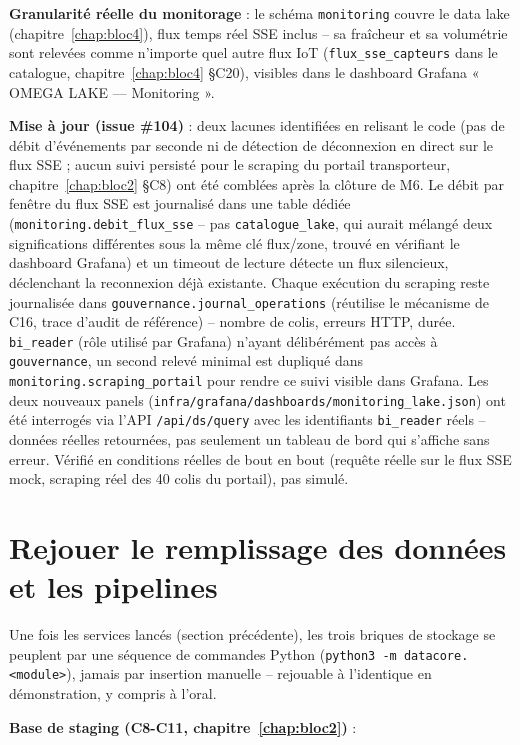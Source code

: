 \textbf{Granularité réelle du monitorage} : le schéma
\texttt{monitoring} couvre le data lake (chapitre~\ref{chap:bloc4}),
flux temps réel SSE inclus -- sa fraîcheur et sa volumétrie sont
relevées comme n'importe quel autre flux IoT (\texttt{flux\_sse\_capteurs}
dans le catalogue, chapitre~\ref{chap:bloc4} §C20), visibles dans le
dashboard Grafana « OMEGA LAKE --- Monitoring ».

\textbf{Mise à jour (issue \#104)} : deux lacunes identifiées en
relisant le code (pas de débit d'événements par seconde ni de
détection de déconnexion en direct sur le flux SSE ; aucun suivi
persisté pour le scraping du portail transporteur, chapitre~\ref{chap:bloc2}
§C8) ont été comblées après la clôture de M6. Le débit par fenêtre du
flux SSE est journalisé dans une table dédiée
(\texttt{monitoring.debit\_flux\_sse} -- pas \texttt{catalogue\_lake},
qui aurait mélangé deux significations différentes sous la même clé
flux/zone, trouvé en vérifiant le dashboard Grafana) et un timeout de
lecture détecte un flux silencieux, déclenchant la reconnexion déjà
existante. Chaque exécution du scraping reste journalisée dans
\texttt{gouvernance.journal\_operations} (réutilise le mécanisme de
C16, trace d'audit de référence) -- nombre de colis, erreurs HTTP,
durée. \texttt{bi\_reader} (rôle utilisé par Grafana) n'ayant
délibérément pas accès à \texttt{gouvernance}, un second relevé
minimal est dupliqué dans \texttt{monitoring.scraping\_portail} pour
rendre ce suivi visible dans Grafana. Les deux nouveaux panels
(\texttt{infra/grafana/dashboards/monitoring\_lake.json}) ont été
interrogés via l'API \texttt{/api/ds/query} avec les identifiants
\texttt{bi\_reader} réels -- données réelles retournées, pas seulement
un tableau de bord qui s'affiche sans erreur. Vérifié en conditions
réelles de bout en bout (requête réelle sur le flux SSE mock, scraping
réel des 40 colis du portail), pas simulé.

\section{Rejouer le remplissage des données et les pipelines}

Une fois les services lancés (section précédente), les trois briques
de stockage se peuplent par une séquence de commandes Python
(\texttt{python3 -m datacore.<module>}), jamais par insertion manuelle
-- rejouable à l'identique en démonstration, y compris à l'oral.

\textbf{Base de staging (C8-C11, chapitre~\ref{chap:bloc2})} :


